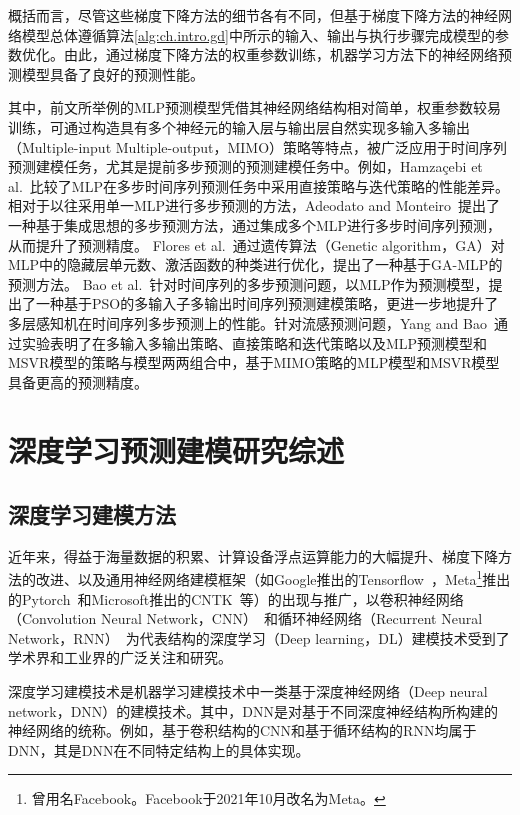 概括而言，尽管这些梯度下降方法的细节各有不同，但基于梯度下降方法的神经网络模型总体遵循算法\ref{alg:ch.intro.gd}中所示的输入、输出与执行步骤完成模型的参数优化。由此，通过梯度下降方法的权重参数训练，机器学习方法下的神经网络预测模型具备了良好的预测性能。

其中，前文所举例的MLP预测模型凭借其神经网络结构相对简单，权重参数较易训练，可通过构造具有多个神经元的输入层与输出层自然实现多输入多输出（Multiple-input Multiple-output，MIMO）策略等特点，被广泛应用于时间序列预测建模任务，尤其是提前多步预测的预测建模任务中。例如，Hamzaçebi et al.~\cite{hamzacebiComparison2009}比较了MLP在多步时间序列预测任务中采用直接策略与迭代策略的性能差异。相对于以往采用单一MLP进行多步预测的方法，Adeodato and Monteiro~\cite{adeodatoMLP2011}提出了一种基于集成思想的多步预测方法，通过集成多个MLP进行多步时间序列预测，从而提升了预测精度。
Flores et al.~\cite{floresEvolutive2012}通过遗传算法（Genetic algorithm，GA）对MLP中的隐藏层单元数、激活函数的种类进行优化，提出了一种基于GA-MLP的预测方法。
Bao et al.~\cite{baoPSOMISMO2014}针对时间序列的多步预测问题，以MLP作为预测模型，提出了一种基于PSO的多输入子多输出时间序列预测建模策略，更进一步地提升了多层感知机在时间序列多步预测上的性能。针对流感预测问题，Yang and Bao~\cite{yangComprehensive2021}通过实验表明了在多输入多输出策略、直接策略和迭代策略以及MLP预测模型和MSVR模型的策略与模型两两组合中，基于MIMO策略的MLP模型和MSVR模型具备更高的预测精度。

\section{深度学习预测建模研究综述}
\subsection{深度学习建模方法}
近年来，得益于海量数据的积累、计算设备浮点运算能力的大幅提升、梯度下降方法的改进、以及通用神经网络建模框架（如Google推出的Tensorflow~\cite{abadiTensorflow2016}，Meta\footnote{曾用名Facebook。Facebook于2021年10月改名为Meta。}推出的Pytorch~\cite{paszkePytorch2019}和Microsoft推出的CNTK~\cite{seideCNTK2016}等）的出现与推广，以卷积神经网络（Convolution Neural Network，CNN）~\cite{li2016juanji}和循环神经网络（Recurrent Neural Network，RNN）~\cite{yang2018xunhuan}为代表结构的深度学习（Deep learning，DL）建模技术受到了学术界和工业界的广泛关注和研究。

深度学习建模技术是机器学习建模技术中一类基于深度神经网络（Deep neural network，DNN）的建模技术\cite{lecunDeep2015}。其中，DNN是对基于不同深度神经结构所构建的神经网络的统称。例如，基于卷积结构的CNN和基于循环结构的RNN均属于DNN，其是DNN在不同特定结构上的具体实现。

